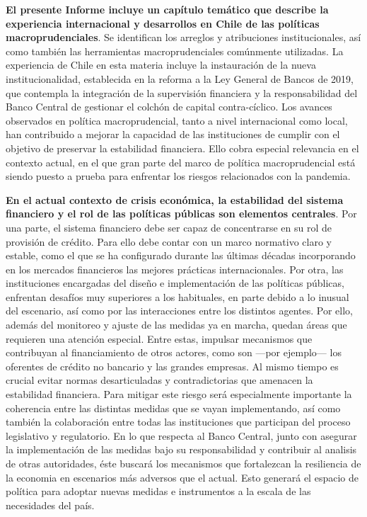 \documentclass[
]{book}
\begin{document}
\textbf{El presente Informe incluye un capítulo temático que describe la experiencia internacional y desarrollos en Chile de las políticas macroprudenciales}. Se identifican los arreglos y atribuciones institucionales,
así como también las herramientas macroprudenciales comúnmente utilizadas.
La experiencia de Chile en esta materia incluye la instauración de la nueva
institucionalidad, establecida en la reforma a la Ley General de Bancos de 2019,
que contempla la integración de la supervisión financiera y la responsabilidad
del Banco Central de gestionar el colchón de capital contra-cíclico. Los avances
observados en política macroprudencial, tanto a nivel internacional como local,
han contribuido a mejorar la capacidad de las instituciones de cumplir con el
objetivo de preservar la estabilidad financiera. Ello cobra especial relevancia en
el contexto actual, en el que gran parte del marco de política macroprudencial
está siendo puesto a prueba para enfrentar los riesgos relacionados con la
pandemia.

\textbf{En el actual contexto de crisis económica, la estabilidad del sistema financiero y el rol de las políticas públicas son elementos centrales}.
Por una parte, el sistema financiero debe ser capaz de concentrarse en su rol
de provisión de crédito. Para ello debe contar con un marco normativo claro y
estable, como el que se ha configurado durante las últimas décadas incorporando
en los mercados financieros las mejores prácticas internacionales. Por otra, las
instituciones encargadas del diseño e implementación de las políticas públicas,
enfrentan desafíos muy superiores a los habituales, en parte debido a lo inusual
del escenario, así como por las interacciones entre los distintos agentes. Por
ello, además del monitoreo y ajuste de las medidas ya en marcha, quedan áreas
que requieren una atención especial. Entre estas, impulsar mecanismos que
contribuyan al financiamiento de otros actores, como son ---por ejemplo--- los
oferentes de crédito no bancario y las grandes empresas. Al mismo tiempo
es crucial evitar normas desarticuladas y contradictorias que amenacen la
estabilidad financiera. Para mitigar este riesgo será especialmente importante
la coherencia entre las distintas medidas que se vayan implementando, así
como también la colaboración entre todas las instituciones que participan del
proceso legislativo y regulatorio. En lo que respecta al Banco Central, junto con
asegurar la implementación de las medidas bajo su responsabilidad y contribuir
al analisis de otras autoridades, éste buscará los mecanismos que fortalezcan
la resiliencia de la economia en escenarios más adversos que el actual. Esto
generará el espacio de política para adoptar nuevas medidas e instrumentos a
la escala de las necesidades del país.
\end{document}

